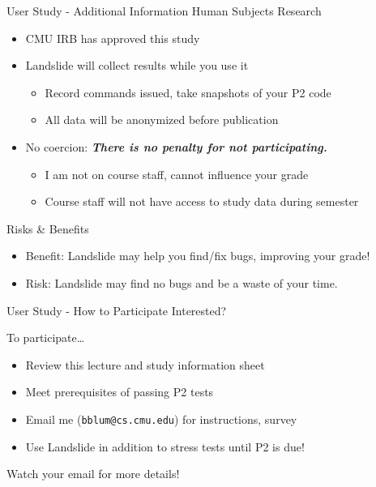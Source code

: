 \documentclass[xcolor=dvipsnames]{beamer}
\begin{document}
\begin{frame}{User Study - Additional Information}
	Human Subjects Research
	\begin{itemize}
		\item CMU IRB has approved this study
		\item Landslide will collect results while you use it
		\begin{itemize}
			\item Record commands issued, take snapshots of your P2 code
			\item All data will be anonymized before publication
		\end{itemize}
		\item No coercion: {\bf \em There is no penalty for not participating.}
		\begin{itemize}
			\item I am not on course staff, cannot influence your grade
			\item Course staff will not have access to study data during semester
		\end{itemize}
	\end{itemize}
	\pause
	\linegap

	Risks \& Benefits
	\begin{itemize}
		\item Benefit: Landslide may help you find/fix bugs, improving your grade!
		\item Risk: Landslide may find no bugs and be a waste of your time.
	\end{itemize}
\end{frame}

\begin{frame}{User Study - How to Participate}
	Interested?
	\linegap

	To participate\dots
	\begin{itemize}
		\item Review this lecture and study information sheet
		\item Meet prerequisites of passing P2 tests
		\item Email me ({\tt bblum@cs.cmu.edu}) for instructions, survey
		\item Use Landslide in addition to stress tests until P2 is due!
	\end{itemize}
	\linegap

	Watch your email for more details!
\end{frame}
\end{document}
